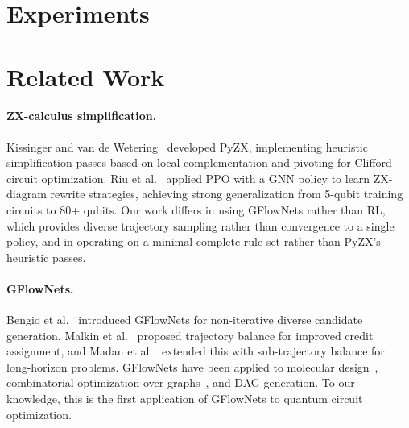 \documentclass[11pt,a4paper]{article}
\begin{document}
\section{Experiments}\label{sec:experiments}



\section{Related Work}\label{sec:related}

\paragraph{ZX-calculus simplification.}
Kissinger and van de Wetering~\cite{kissinger2020pyzx} developed PyZX,
implementing heuristic simplification passes based on local
complementation and pivoting for Clifford circuit optimization.  Riu et
al.~\cite{riu2025rl} applied PPO with a GNN policy to learn ZX-diagram
rewrite strategies, achieving strong generalization from 5-qubit training
circuits to 80+ qubits.  Our work differs in using GFlowNets rather than
RL, which provides diverse trajectory sampling rather than convergence to
a single policy, and in operating on a minimal complete rule set rather
than PyZX's heuristic passes.

\paragraph{GFlowNets.}
Bengio et al.~\cite{bengio2021flow} introduced GFlowNets for
non-iterative diverse candidate generation.  Malkin et
al.~\cite{malkin2022trajectory} proposed trajectory balance for improved
credit assignment, and Madan et al.~\cite{madan2023subtb} extended this
with sub-trajectory balance for long-horizon problems.  GFlowNets have
been applied to molecular design~\cite{bengio2021flow}, combinatorial
optimization over graphs~\cite{zhang2023gflownet_combinatorial}, and DAG
generation.  To our knowledge, this is the first application of GFlowNets
to quantum circuit optimization.
\end{document}
